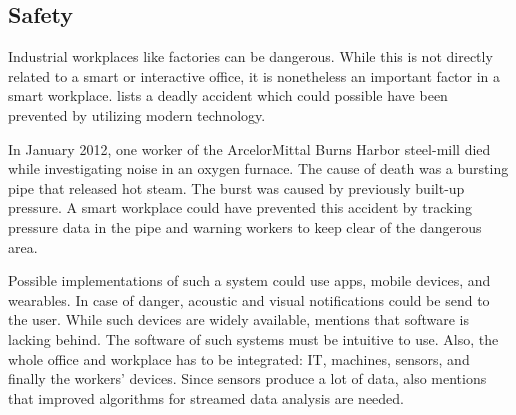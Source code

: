 \subsection{Safety}\label{sec:safety}
Industrial workplaces like factories can be dangerous. While this is not directly related to a smart or interactive office, it is nonetheless an important factor in a smart workplace. \cite{sda-wired} lists a deadly accident which could possible have been prevented by utilizing modern technology.

In January 2012, one worker of the ArcelorMittal Burns Harbor steel-mill died while investigating noise in an oxygen furnace. The cause of death was a bursting pipe that released hot steam. The burst was caused by previously built-up pressure. A smart workplace could have prevented this accident by tracking pressure data in the pipe and warning workers to keep clear of the dangerous area.

Possible implementations of such a system could use apps, mobile devices, and wearables. In case of danger, acoustic and visual notifications could be send to the user. While such devices are widely available, \cite{sda-wired} mentions that software is lacking behind. The software of such systems must be intuitive to use. Also, the whole office and workplace has to be integrated: IT, machines, sensors, and finally the workers' devices. Since sensors produce a lot of data, \cite{sda-wired} also mentions that improved algorithms for streamed data analysis are needed.


